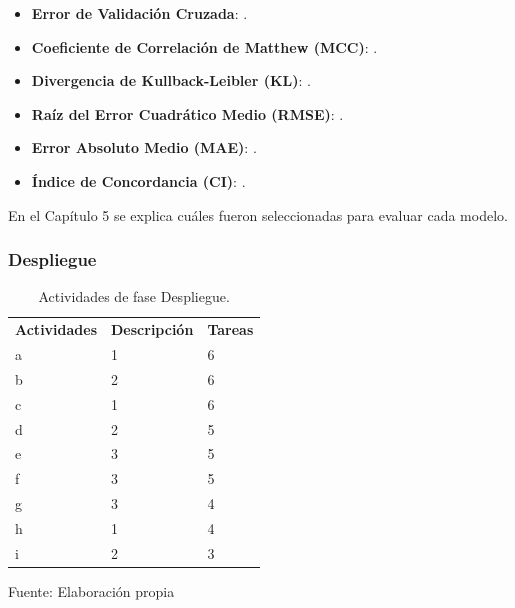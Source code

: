 \begin{itemize}
	\item \textbf{Error de Validación Cruzada}: \cite{pr_mitra2014phrases}.
	\item \textbf{Coeficiente de Correlación de Matthew (MCC)}: \cite{pr_kaur2017socmedcrowd}.
	\item \textbf{Divergencia de Kullback-Leibler (KL)}: \cite{pr_jin2019dayssuccess}.
	\item \textbf{Raíz del Error Cuadrático Medio (RMSE)}: \cite{pr_jin2019dayssuccess}.
	\item \textbf{Error Absoluto Medio (MAE)}: \cite{pr_jin2019dayssuccess}.
	\item \textbf{Índice de Concordancia (CI)}: \cite{pr_jin2019dayssuccess}.
\end{itemize}

En el Capítulo 5 se explica cuáles fueron seleccionadas para evaluar cada modelo.

\subsubsection{Despliegue}

\begin{longtable}{|M{5cm}|M{5cm}|M{5cm}|}
	\caption[Actividades de fase Despliegue]{Actividades de fase Despliegue.}
	\label{3:table8}
	\newcommand{\multirot}[1]{\multirow{2}{*}[-8ex]{\rotcell{\rlap{#1}}}}
	\footnotesize
	\centering
	\small
	\tabularnewline\hline
	\textbf{Actividades} & \textbf{Descripción} & \textbf{Tareas}
	\\
	\hline
	a
	& 1
	& 6                                               
	\\
	\hline
	b
	& 2
	& 6
	\\
	\hline
	c
	& 1
	& 6
	\\
	\hline
	d
	& 2
	& 5
	\\
	\hline
	e
	& 3
	& 5
	\\
	\hline
	f
	& 3
	& 5
	\\
	\hline
	g
	& 3
	& 4
	\\
	\hline
	h
	& 1
	& 4
	\\
	\hline
	i
	& 2
	& 3
	\\
	\hline
\end{longtable}%

\begin{flushleft}	%
	\small Fuente: Elaboración propia
\end{flushleft}


